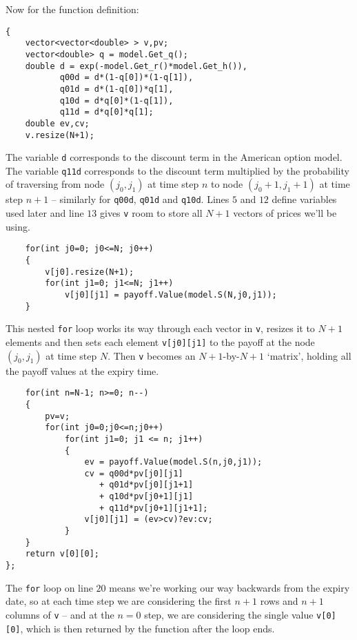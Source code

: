 \documentclass[12pt,a4paper]{article}
\begin{document}
Now for the function definition:
\begin{lstlisting}
{
    vector<vector<double> > v,pv;
    vector<double> q = model.Get_q();
    double d = exp(-model.Get_r()*model.Get_h()),
           q00d = d*(1-q[0])*(1-q[1]),
           q01d = d*(1-q[0])*q[1],
           q10d = d*q[0]*(1-q[1]),
           q11d = d*q[0]*q[1];
    double ev,cv;
    v.resize(N+1);
\end{lstlisting}

The variable \texttt{d} corresponds to the discount term in the American option 
model.
The variable \texttt{q11d} corresponds to the discount term multiplied by the 
probability of traversing from node $(j_0,j_1)$ at time step $n$ to node 
$(j_0+1,j_1+1)$ at time step $n+1$ -- similarly for \texttt{q00d}, \texttt{q01d} 
and \texttt{q10d}.
Lines $5$ and $12$ define variables used later and line $13$ gives \texttt{v} 
room to store all $N+1$ vectors of prices we'll be using.



\begin{lstlisting}
    for(int j0=0; j0<=N; j0++)
    {
        v[j0].resize(N+1);
        for(int j1=0; j1<=N; j1++)
            v[j0][j1] = payoff.Value(model.S(N,j0,j1));
    }
\end{lstlisting}

This nested \texttt{for} loop works its way through each vector in \texttt{v}, 
resizes it to $N+1$ elements and then sets each element \texttt{v[j0][j1]} to 
the payoff at the node $(j_0,j_1)$ at time step $N$.
Then \texttt{v} becomes an $N+1$-by-$N+1$ `matrix', holding all the payoff 
values at the expiry time.

\begin{lstlisting}    
    for(int n=N-1; n>=0; n--)
    {
        pv=v;
        for(int j0=0;j0<=n;j0++)
            for(int j1=0; j1 <= n; j1++)
            {
                ev = payoff.Value(model.S(n,j0,j1));
                cv = q00d*pv[j0][j1]
                   + q01d*pv[j0][j1+1]
                   + q10d*pv[j0+1][j1]
                   + q11d*pv[j0+1][j1+1];
                v[j0][j1] = (ev>cv)?ev:cv;
            }
    }
    return v[0][0];
};
\end{lstlisting}

The \texttt{for} loop on line $20$ means we're working our way backwards from 
the expiry date, so at each time step we are considering the first $n+1$ rows 
and $n+1$ columns of \texttt{v} -- and at the $n=0$ step, we are considering the 
single value \texttt{v[0][0]}, which is then returned by the function after the 
loop ends.
\end{document}
